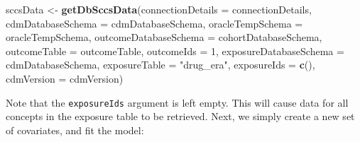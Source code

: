 \documentclass[
]{article}
\newenvironment{Shaded}{\begin{snugshade}}{\end{snugshade}}
\newcommand{\DataTypeTok}[1]{\textcolor[rgb]{0.13,0.29,0.53}{#1}}
\newcommand{\DecValTok}[1]{\textcolor[rgb]{0.00,0.00,0.81}{#1}}
\newcommand{\KeywordTok}[1]{\textcolor[rgb]{0.13,0.29,0.53}{\textbf{#1}}}
\newcommand{\NormalTok}[1]{#1}
\newcommand{\StringTok}[1]{\textcolor[rgb]{0.31,0.60,0.02}{#1}}
\begin{document}
\begin{Shaded}
\begin{Highlighting}[]
\NormalTok{sccsData <-}\StringTok{ }\KeywordTok{getDbSccsData}\NormalTok{(}\DataTypeTok{connectionDetails =}\NormalTok{ connectionDetails,}
                          \DataTypeTok{cdmDatabaseSchema =}\NormalTok{ cdmDatabaseSchema,}
                          \DataTypeTok{oracleTempSchema =}\NormalTok{ oracleTempSchema,}
                          \DataTypeTok{outcomeDatabaseSchema =}\NormalTok{ cohortDatabaseSchema,}
                          \DataTypeTok{outcomeTable =}\NormalTok{ outcomeTable,}
                          \DataTypeTok{outcomeIds =} \DecValTok{1}\NormalTok{,}
                          \DataTypeTok{exposureDatabaseSchema =}\NormalTok{ cdmDatabaseSchema,}
                          \DataTypeTok{exposureTable =} \StringTok{"drug_era"}\NormalTok{,}
                          \DataTypeTok{exposureIds =} \KeywordTok{c}\NormalTok{(),}
                          \DataTypeTok{cdmVersion =}\NormalTok{ cdmVersion)}
\end{Highlighting}
\end{Shaded}

Note that the \texttt{exposureIds} argument is left empty. This will
cause data for all concepts in the exposure table to be retrieved. Next,
we simply create a new set of covariates, and fit the model:
\end{document}
